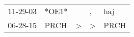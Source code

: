 \begin{supertabular}{lllll}
 11-29-03 &  *OE1* &               &             , &   haj \\
 06-28-15 &   PRCH &  \textgreater &  \textgreater &  PRCH \\
\end{supertabular}
